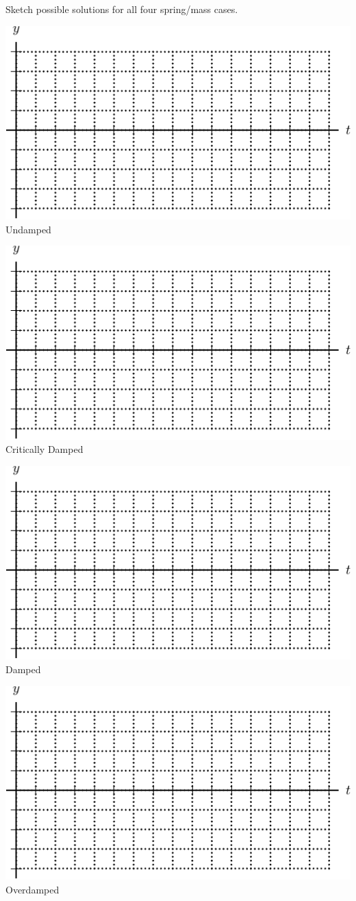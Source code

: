 \problem Sketch possible solutions for all four spring/mass cases.
  \begin{minipage}[h]{0.475\linewidth}
    \begin{center}
      
   \vspace{0pt} 
   \includegraphics[width=0.5\linewidth]{graphics/notes_08_spring_mass_axes}\\
Undamped 

\hrulefill

   \includegraphics[width=0.5\linewidth]{graphics/notes_08_spring_mass_axes}\\
Critically Damped
    \end{center}
  \end{minipage}
  \begin{minipage}[h]{0.475\linewidth}
    \begin{center}
      
   \vspace{0pt} 
   \includegraphics[width=0.5\linewidth]{graphics/notes_08_spring_mass_axes}\\
Damped  

\hrulefill

   \includegraphics[width=0.5\linewidth]{graphics/notes_08_spring_mass_axes}\\
Overdamped
    \end{center}
  \end{minipage}


